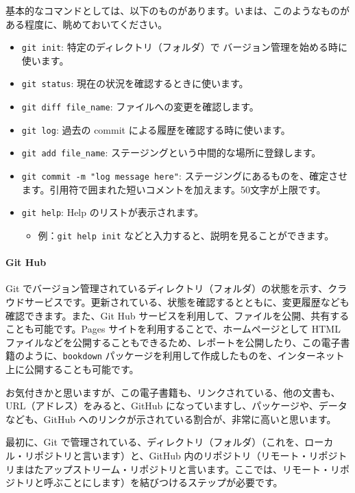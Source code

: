 \documentclass[
]{bxjsbook}
\providecommand{\tightlist}{%
  \setlength{\itemsep}{0pt}\setlength{\parskip}{0pt}}
\theoremstyle{definition}
\theoremstyle{definition}
\theoremstyle{definition}
\theoremstyle{definition}
\theoremstyle{remark}
\begin{document}
基本的なコマンドとしては、以下のものがあります。いまは、このようなものがある程度に、眺めておいてください。

\begin{itemize}
\tightlist
\item
  \texttt{git\ init}: 特定のディレクトリ（フォルダ）で バージョン管理を始める時に使います。
\item
  \texttt{git\ status}: 現在の状況を確認するときに使います。
\item
  \texttt{git\ diff\ file\_name}: ファイルへの変更を確認します。
\item
  \texttt{git\ log}: 過去の commit による履歴を確認する時に使います。
\item
  \texttt{git\ add\ file\_name}: ステージングという中間的な場所に登録します。
\item
  \texttt{git\ commit\ -m\ "log\ message\ here"}: ステージングにあるものを、確定させます。引用符で囲まれた短いコメントを加えます。50文字が上限です。
\item
  \texttt{git\ help}: Help のリストが表示されます。

  \begin{itemize}
  \tightlist
  \item
    例：\texttt{git\ help\ init} などと入力すると、説明を見ることができます。
  \end{itemize}
\end{itemize}

\hypertarget{git-hub}{%
\paragraph{Git Hub}\label{git-hub}}

Git でバージョン管理されているディレクトリ（フォルダ）の状態を示す、クラウドサービスです。更新されている、状態を確認するとともに、変更履歴なども確認できます。また、Git Hub サービスを利用して、ファイルを公開、共有することも可能です。Pages サイトを利用することで、ホームページとして HTML ファイルなどを公開することもできるため、レポートを公開したり、この電子書籍のように、\texttt{bookdown} パッケージを利用して作成したものを、インターネット上に公開することも可能です。

お気付きかと思いますが、この電子書籍も、リンクされている、他の文書も、URL（アドレス）をみると、GitHub になっていますし、パッケージや、データなども、GitHub へのリンクが示されている割合が、非常に高いと思います。

最初に、Git で管理されている、ディレクトリ（フォルダ）（これを、ローカル・リポジトリと言います）と、GitHub 内のリポジトリ（リモート・リポジトリまはたアップストリーム・リポジトリと言います。ここでは、リモート・リポジトリと呼ぶことにします）を結びつけるステップが必要です。
\end{document}
